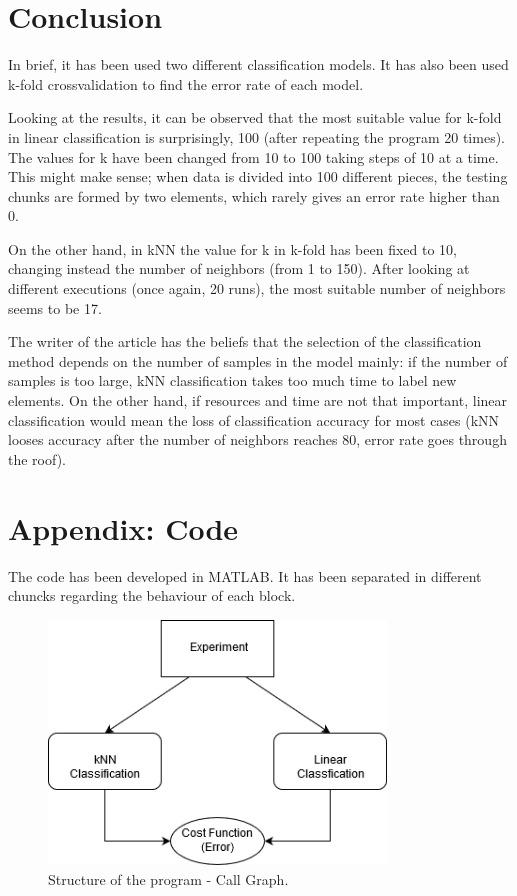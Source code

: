 \documentclass[11pt]{article}
\begin{document}
\section{Conclusion}

In brief, it has been used two different classification models. It has also been
used k-fold crossvalidation to find the error rate of each model.

Looking at the results, it can be observed that the most suitable value for
k-fold in linear classification is surprisingly, 100 (after repeating the
program 20 times). The values for k have been changed from 10 to 100 taking 
steps of 10 at a time. This might make sense; when data is divided into 100 
different pieces, the testing chunks are formed by two elements, which rarely 
gives an error rate higher than 0.

On the other hand, in kNN the value for k in k-fold has been fixed to 10,
changing instead the number of neighbors (from 1 to 150). After looking at 
different executions (once again, 20 runs), the most suitable number of 
neighbors seems to be 17.

The writer of the article has the beliefs that the selection of the
classification method depends on the number of samples in the model mainly: if
the number of samples is too large, kNN classification takes too much time to
label new elements. On the other hand, if resources and time are not that
important, linear classification would mean the loss of classification accuracy
for most cases (kNN looses accuracy after the number of neighbors reaches 80,
error rate goes through the roof).

\newpage

\section*{Appendix: Code}

The code has been developed in MATLAB. It has been separated in different
chuncks regarding the behaviour of each block.

\begin{figure}[h]
 \centering
 \includegraphics[width=0.8\textwidth]{../diagrams/call_tree.png}
 \caption{Structure of the program - Call Graph.}
\end{figure}
\end{document}
